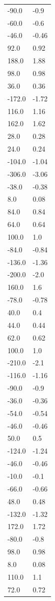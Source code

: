 \begin{longtable}{ll}
-90.0 & -0.9 \\
-60.0 & -0.6 \\
-46.0 & -0.46 \\
92.0 & 0.92 \\
188.0 & 1.88 \\
98.0 & 0.98 \\
36.0 & 0.36 \\
-172.0 & -1.72 \\
116.0 & 1.16 \\
162.0 & 1.62 \\
28.0 & 0.28 \\
24.0 & 0.24 \\
-104.0 & -1.04 \\
-306.0 & -3.06 \\
-38.0 & -0.38 \\
8.0 & 0.08 \\
84.0 & 0.84 \\
64.0 & 0.64 \\
100.0 & 1.0 \\
-84.0 & -0.84 \\
-136.0 & -1.36 \\
-200.0 & -2.0 \\
160.0 & 1.6 \\
-78.0 & -0.78 \\
40.0 & 0.4 \\
44.0 & 0.44 \\
62.0 & 0.62 \\
100.0 & 1.0 \\
-210.0 & -2.1 \\
-116.0 & -1.16 \\
-90.0 & -0.9 \\
-36.0 & -0.36 \\
-54.0 & -0.54 \\
-46.0 & -0.46 \\
50.0 & 0.5 \\
-124.0 & -1.24 \\
-46.0 & -0.46 \\
-10.0 & -0.1 \\
-66.0 & -0.66 \\
48.0 & 0.48 \\
-132.0 & -1.32 \\
172.0 & 1.72 \\
-80.0 & -0.8 \\
98.0 & 0.98 \\
8.0 & 0.08 \\
110.0 & 1.1 \\
72.0 & 0.72 \\

\end{longtable}
